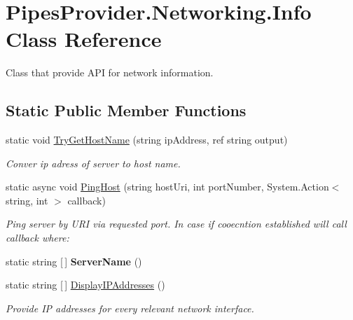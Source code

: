 \hypertarget{class_pipes_provider_1_1_networking_1_1_info}{}\section{Pipes\+Provider.\+Networking.\+Info Class Reference}
\label{class_pipes_provider_1_1_networking_1_1_info}


Class that provide A\+PI for network information.  


\subsection*{Static Public Member Functions}
\begin{DoxyCompactItemize}
\item 
static void \mbox{\hyperlink{class_pipes_provider_1_1_networking_1_1_info_af2fa3a471e2f6245bed859c86b6f0c0e}{Try\+Get\+Host\+Name}} (string ip\+Address, ref string output)
\begin{DoxyCompactList}\small\item\em Conver ip adress of server to host name. \end{DoxyCompactList}\item 
static async void \mbox{\hyperlink{class_pipes_provider_1_1_networking_1_1_info_aa609196312941e05536dcb3526b9a2ce}{Ping\+Host}} (string host\+Uri, int port\+Number, System.\+Action$<$ string, int $>$ callback)
\begin{DoxyCompactList}\small\item\em Ping server by U\+RI via requested port. In case if cooecntion established will call callback where\+: \end{DoxyCompactList}\item 
\mbox{\label{class_pipes_provider_1_1_networking_1_1_info_a3bc757d31da1bf0759a252ee0f919917}} 
static string \mbox{[}$\,$\mbox{]} {\bfseries Server\+Name} ()
\item 
static string \mbox{[}$\,$\mbox{]} \mbox{\hyperlink{class_pipes_provider_1_1_networking_1_1_info_ac8097e6a6bccbeae15e309ce72dbac91}{Display\+I\+P\+Addresses}} ()
\begin{DoxyCompactList}\small\item\em Provide IP addresses for every relevant network interface. \end{DoxyCompactList}\end{DoxyCompactItemize}



